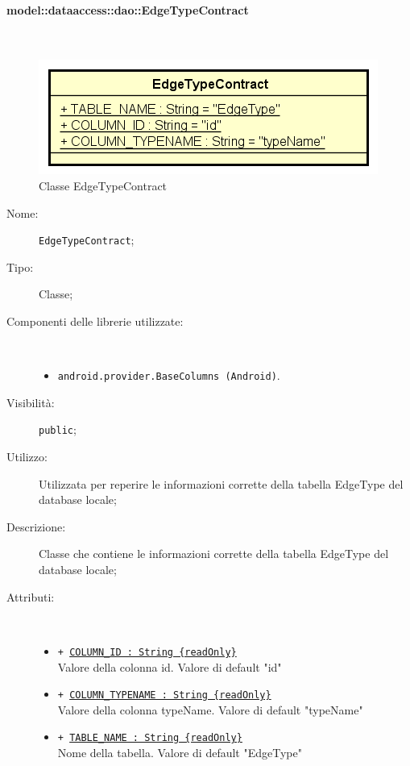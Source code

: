 \documentclass[../DefinizioneDiProdotto.tex]{subfiles}
\begin{document}
\paragraph{model::dataaccess::dao::EdgeTypeContract}
\
\begin{figure}[H]
	\centering
	\includegraphics[width=\maxwidth]{img/EdgeTypeContract.png}
	\caption{Classe EdgeTypeContract}\label{fig:model::dataaccess::dao::EdgeTypeContract} 
\end{figure}
\begin{description}
	\item[Nome:] \texttt{EdgeTypeContract};
	\item[Tipo:] Classe;
	\item[Componenti delle librerie utilizzate:] \
	\begin{itemize}
		\item \texttt{android.provider.BaseColumns (Android)}.
		
	\end{itemize}
	\item[Visibilità:] \texttt{public};
	\item[Utilizzo:] Utilizzata per reperire le informazioni corrette della tabella EdgeType del database locale;
	\item[Descrizione:] Classe che contiene le informazioni corrette della tabella EdgeType del database locale;
	\item[Attributi:] \
	\begin{itemize}
		\item \texttt{+ \underline{COLUMN\_ID : String \{readOnly\}}}\\
		Valore della colonna id. Valore di default "id"
		
		\item \texttt{+ \underline{COLUMN\_TYPENAME : String \{readOnly\}}}\\
		Valore della colonna typeName. Valore di default "typeName"
		
		\item \texttt{+ \underline{TABLE\_NAME : String \{readOnly\}}}\\
		Nome della tabella. Valore di default "EdgeType"
		
	\end{itemize}
\end{description}
\end{document}
